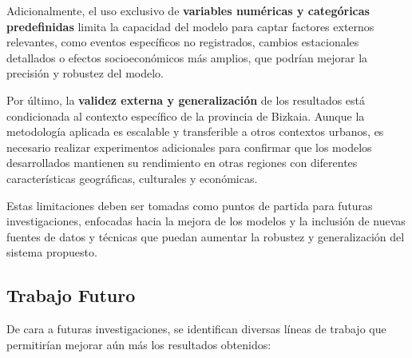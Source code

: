 Adicionalmente, el uso exclusivo de \textbf{variables numéricas y categóricas predefinidas} limita la capacidad del modelo para captar factores externos relevantes, como eventos específicos no registrados, cambios estacionales detallados o efectos socioeconómicos más amplios, que podrían mejorar la precisión y robustez del modelo.

Por último, la \textbf{validez externa y generalización} de los resultados está condicionada al contexto específico de la provincia de Bizkaia. Aunque la metodología aplicada es escalable y transferible a otros contextos urbanos, es necesario realizar experimentos adicionales para confirmar que los modelos desarrollados mantienen su rendimiento en otras regiones con diferentes características geográficas, culturales y económicas.

Estas limitaciones deben ser tomadas como puntos de partida para futuras investigaciones, enfocadas hacia la mejora de los modelos y la inclusión de nuevas fuentes de datos y técnicas que puedan aumentar la robustez y generalización del sistema propuesto.

\subsection{Trabajo Futuro}
\label{sec:trabajo_futuro}

De cara a futuras investigaciones, se identifican diversas líneas de trabajo que permitirían mejorar aún más los resultados obtenidos:

